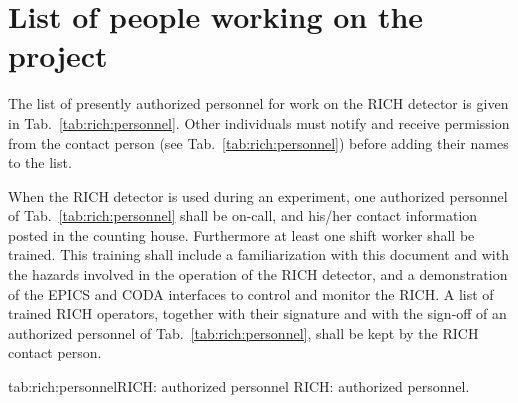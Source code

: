 \section{List of people working on the project} 
 
The list
of presently authorized personnel for work on the RICH detector 
is given in Tab.~\ref{tab:rich:personnel}.
Other individuals must notify and receive permission from
the contact person (see Tab.~\ref{tab:rich:personnel}) before adding their names 
to the list. 

When the RICH detector is used during an experiment, one authorized personnel of 
Tab.~\ref{tab:rich:personnel} shall be on-call, and his/her contact information
posted in the counting house. Furthermore at least one shift worker shall be 
trained. 
This training shall include a familiarization with this document and with 
the hazards involved in the operation of the RICH detector, and a demonstration
of the EPICS and CODA interfaces to control and monitor the RICH.
A list of trained RICH operators, together with their signature and 
with the sign-off of an authorized personnel of Tab.~\ref{tab:rich:personnel},
shall be kept by the RICH contact person.


\begin{namestab}{tab:rich:personnel}{RICH: authorized personnel}{
RICH: authorized personnel.}
 \MauroIodice{}
 \FrancescoCusanno{}
\end{namestab}


